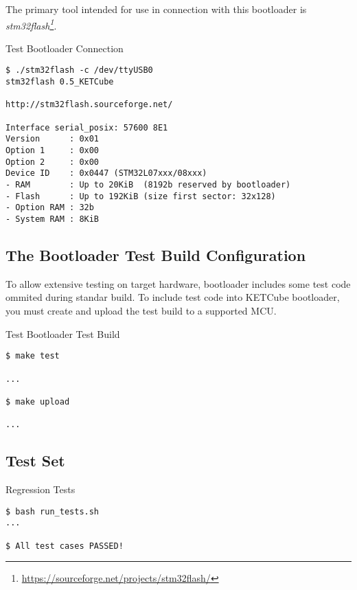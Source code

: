 The primary tool intended for use in connection with this bootloader is {\it stm32flash\footnote{\url{https://sourceforge.net/projects/stm32flash/}}}.

\begin{docCodeExampleTitled}{Test Bootloader Connection}
\begin{verbatim}
$ ./stm32flash -c /dev/ttyUSB0 
stm32flash 0.5_KETCube

http://stm32flash.sourceforge.net/

Interface serial_posix: 57600 8E1
Version      : 0x01
Option 1     : 0x00
Option 2     : 0x00
Device ID    : 0x0447 (STM32L07xxx/08xxx)
- RAM        : Up to 20KiB  (8192b reserved by bootloader)
- Flash      : Up to 192KiB (size first sector: 32x128)
- Option RAM : 32b
- System RAM : 8KiB
\end{verbatim}
\end{docCodeExampleTitled}

\subsection{The Bootloader Test Build Configuration}

To allow extensive testing on target hardware, bootloader includes some test code ommited during standar build. 
To include test code into KETCube bootloader, you must create and upload the test build to a supported MCU.

\begin{docCodeExampleTitled}{Test Bootloader Test Build}
\begin{verbatim}
$ make test

...

$ make upload

...

\end{verbatim}
\end{docCodeExampleTitled}

\subsection{Test Set}

\begin{docCodeExampleTitled}{Regression Tests}
\begin{verbatim}
$ bash run_tests.sh
...

$ All test cases PASSED!
\end{verbatim}
\end{docCodeExampleTitled}

